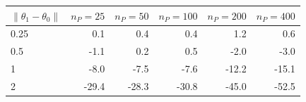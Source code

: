 \begin{tabular}{lrrrrr}
\toprule
$\|\theta_1-\theta_0\|$ & $n_P=25$ & $n_P=50$ & $n_P=100$ & $n_P=200$ & $n_P=400$ \\
\midrule
0.25 & 0.1 & 0.4 & 0.4 & 1.2 & 0.6 \\
0.5 & -1.1 & 0.2 & 0.5 & -2.0 & -3.0 \\
1 & -8.0 & -7.5 & -7.6 & -12.2 & -15.1 \\
2 & -29.4 & -28.3 & -30.8 & -45.0 & -52.5 \\
\bottomrule
\end{tabular}
